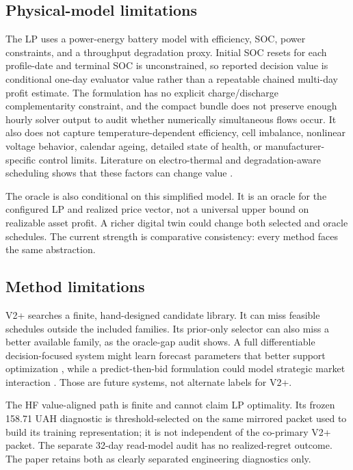 \subsection{Physical-model limitations}

The LP uses a power-energy battery model with efficiency, SOC, power constraints, and a throughput degradation proxy. Initial SOC resets for each profile-date and terminal SOC is unconstrained, so reported decision value is conditional one-day evaluator value rather than a repeatable chained multi-day profit estimate. The formulation has no explicit charge/discharge complementarity constraint, and the compact bundle does not preserve enough hourly solver output to audit whether numerically simultaneous flows occur. It also does not capture temperature-dependent efficiency, cell imbalance, nonlinear voltage behavior, calendar ageing, detailed state of health, or manufacturer-specific control limits. Literature on electro-thermal and degradation-aware scheduling shows that these factors can change value \cite{hesse2019ageing,maheshwari2020degradation,kumtepeli2020arbitrage}.

The oracle is also conditional on this simplified model. It is an oracle for the configured LP and realized price vector, not a universal upper bound on realizable asset profit. A richer digital twin could change both selected and oracle schedules. The current strength is comparative consistency: every method faces the same abstraction.

\subsection{Method limitations}

V2+ searches a finite, hand-designed candidate library. It can miss feasible schedules outside the included families. Its prior-only selector can also miss a better available family, as the oracle-gap audit shows. A full differentiable decision-focused system might learn forecast parameters that better support optimization \cite{mandi2024dfl,sang2022essdfl}, while a predict-then-bid formulation could model strategic market interaction \cite{yi2025predictbid}. Those are future systems, not alternate labels for V2+.

The HF value-aligned path is finite and cannot claim LP optimality. Its frozen 158.71 UAH diagnostic is threshold-selected on the same mirrored packet used to build its training representation; it is not independent of the co-primary V2+ packet. The separate 32-day read-model audit has no realized-regret outcome. The paper retains both as clearly separated engineering diagnostics only.

